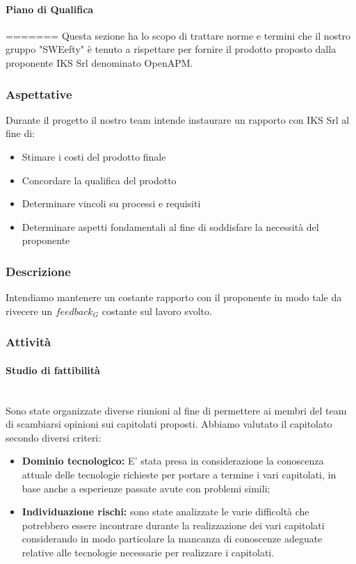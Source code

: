 		\paragraph{Piano di Qualifica}
=======
	Questa sezione ha lo scopo di trattare norme e termini che il nostro gruppo "SWEefty" è tenuto a rispettare per fornire il prodotto proposto dalla proponente IKS Srl denominato OpenAPM.
	\subsubsection{Aspettative}
	Durante il progetto il nostro team intende instaurare un rapporto con IKS Srl al fine di:
    \begin{itemize}
    	\item Stimare i costi del prodotto finale
    	\item Concordare la qualifica del prodotto 
    	\item Determinare vincoli su processi e requisiti
    	\item Determinare aspetti fondamentali al fine di soddisfare la necessità del proponente
    \end{itemize}
	\subsubsection{Descrizione}
	Intendiamo mantenere un costante rapporto con il proponente in modo tale da rivecere un $feedback_G$ costante sul lavoro svolto.
	\subsubsection{Attività} 
		\paragraph{Studio di fattibilità} \mbox{} \\
		Sono state organizzate diverse riunioni al fine di permettere ai membri del team di scambiarsi opinioni sui capitolati proposti. 
		Abbiamo valutato il capitolato secondo diversi criteri:
		\begin{itemize}
			\item \textbf{Dominio tecnologico:} E' stata presa in considerazione la conoscenza attuale delle tecnologie richieste per portare a termine i vari capitolati, in base
			anche a esperienze passate avute con problemi simili;
			\item \textbf{Individuazione rischi:} sono state analizzate le varie difficoltà che potrebbero essere incontrare durante la realizzazione dei vari capitolati considerando 
			in modo particolare la mancanza di conoscenze adeguate relative alle tecnologie necessarie per realizzare i capitolati.
		\end{itemize}  
